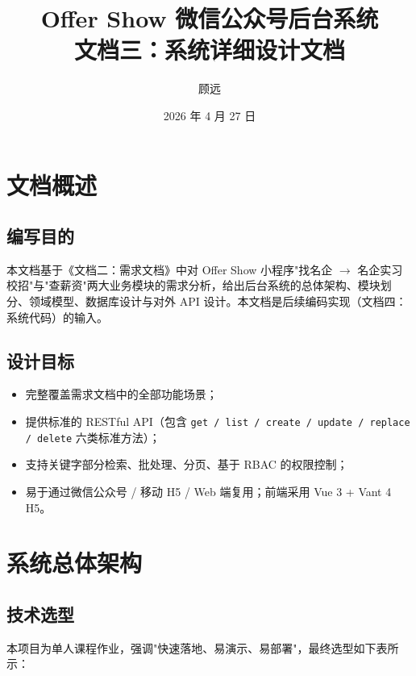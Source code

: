 \documentclass[11pt,a4paper]{ctexart}
\title{\textbf{Offer Show 微信公众号后台系统\\ 文档三：系统详细设计文档}}
\author{顾远\quad 23301095}
\date{2026 年 4 月 27 日}
\begin{document}
\maketitle
\tableofcontents
\newpage

\section{文档概述}

\subsection{编写目的}
本文档基于《文档二：需求文档》中对 Offer Show 小程序"找名企 $\rightarrow$ 名企实习校招"与"查薪资"两大业务模块的需求分析，给出后台系统的总体架构、模块划分、领域模型、数据库设计与对外 API 设计。本文档是后续编码实现（文档四：系统代码）的输入。

\subsection{设计目标}
\begin{itemize}[leftmargin=2em]
    \item 完整覆盖需求文档中的全部功能场景；
    \item 提供标准的 RESTful API（包含 \texttt{get / list / create / update / replace / delete} 六类标准方法）；
    \item 支持关键字部分检索、批处理、分页、基于 RBAC 的权限控制；
    \item 易于通过微信公众号 / 移动 H5 / Web 端复用；前端采用 Vue 3 + Vant 4 H5。
\end{itemize}

\section{系统总体架构}

\subsection{技术选型}
本项目为单人课程作业，强调"快速落地、易演示、易部署"，最终选型如下表所示：
\end{document}
